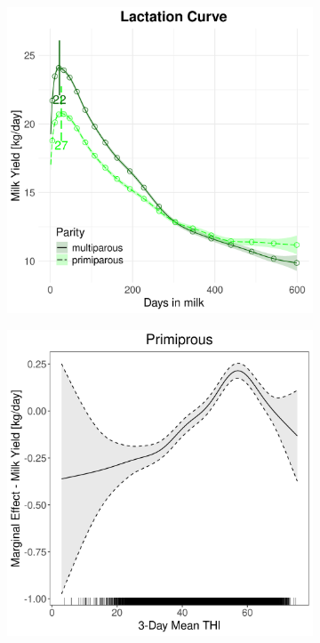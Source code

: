 \begin{figure}[H]
\begin{subfigure}[b]{0.45\textwidth}
        \includegraphics[width=\textwidth]{thesis/figures/models/milk/before2010/je_milk_before2010/je_milk_before2010_marginal_dim_milk_combined.png}
    \end{subfigure}
    \begin{subfigure}[b]{0.45\textwidth}
        \centering
        \includegraphics[width=\textwidth]{thesis/figures/models/milk/before2010/je_milk_before2010/je_milk_before2010_marginal_thi_milk_primi.png}

\end{subfigure}
\end{figure}
